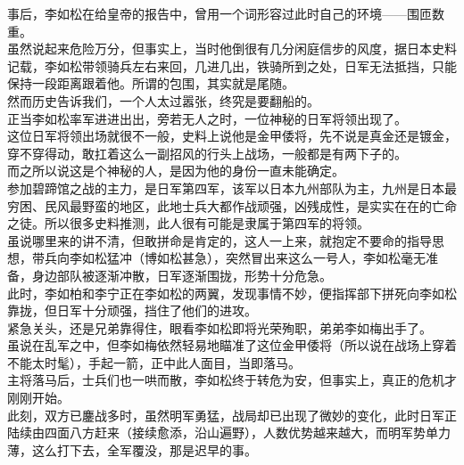 \begin{multicols}{\theparacolNo}
事后，李如松在给皇帝的报告中，曾用一个词形容过此时自己的环境——围匝数重。\\

虽然说起来危险万分，但事实上，当时他倒很有几分闲庭信步的风度，据日本史料记载，李如松带领骑兵左右来回，几进几出，铁骑所到之处，日军无法抵挡，只能保持一段距离跟着他。所谓的包围，其实就是尾随。\\

然而历史告诉我们，一个人太过嚣张，终究是要翻船的。\\

正当李如松率军进进出出，旁若无人之时，一位神秘的日军将领出现了。\\

这位日军将领出场就很不一般，史料上说他是金甲倭将，先不说是真金还是镀金，穿不穿得动，敢扛着这么一副招风的行头上战场，一般都是有两下子的。\\

而之所以说这是个神秘的人，是因为他的身份一直未能确定。\\

参加碧蹄馆之战的主力，是日军第四军，该军以日本九州部队为主，九州是日本最穷困、民风最野蛮的地区，此地士兵大都作战顽强，凶残成性，是实实在在的亡命之徒。所以很多史料推测，此人很有可能是隶属于第四军的将领。\\

虽说哪里来的讲不清，但敢拼命是肯定的，这人一上来，就抱定不要命的指导思想，带兵向李如松猛冲（博如松甚急），突然冒出来这么一号人，李如松毫无准备，身边部队被逐渐冲散，日军逐渐围拢，形势十分危急。\\

此时，李如柏和李宁正在李如松的两翼，发现事情不妙，便指挥部下拼死向李如松靠拢，但日军十分顽强，挡住了他们的进攻。\\

紧急关头，还是兄弟靠得住，眼看李如松即将光荣殉职，弟弟李如梅出手了。\\

虽说在乱军之中，但李如梅依然轻易地瞄准了这位金甲倭将（所以说在战场上穿着不能太时髦），手起一箭，正中此人面目，当即落马。\\

主将落马后，士兵们也一哄而散，李如松终于转危为安，但事实上，真正的危机才刚刚开始。\\

此刻，双方已鏖战多时，虽然明军勇猛，战局却已出现了微妙的变化，此时日军正陆续由四面八方赶来（接续愈添，沿山遍野），人数优势越来越大，而明军势单力薄，这么打下去，全军覆没，那是迟早的事。\\


\end{multicols}
